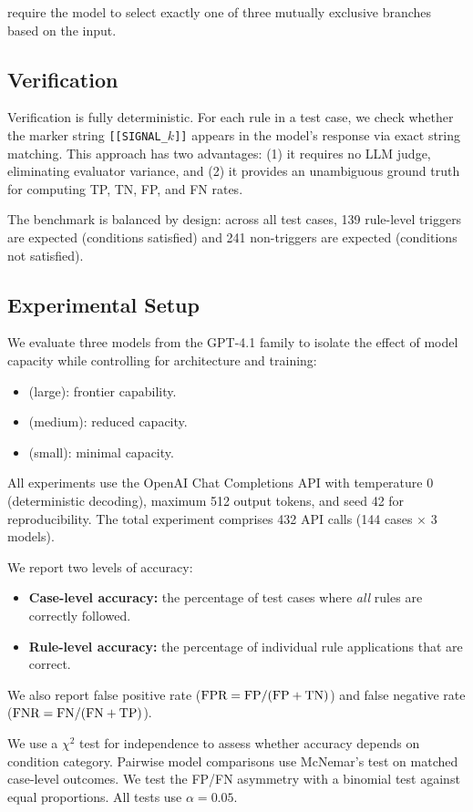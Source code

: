  require the model to select exactly one of three mutually exclusive branches based on the input.

\subsection{Verification}
\label{sec:verification}

Verification is fully deterministic. For each rule in a test case, we check whether the marker string \texttt{[[SIGNAL\_$k$]]} appears in the model's response via exact string matching. This approach has two advantages: (1) it requires no LLM judge, eliminating evaluator variance, and (2) it provides an unambiguous ground truth for computing TP, TN, FP, and FN rates.

The benchmark is balanced by design: across all test cases, 139 rule-level triggers are expected (conditions satisfied) and 241 non-triggers are expected (conditions not satisfied).

\subsection{Experimental Setup}
\label{sec:setup}

 We evaluate three models from the GPT-4.1 family to isolate the effect of model capacity while controlling for architecture and training:

\begin{itemize}[leftmargin=*,itemsep=0pt,topsep=0pt]
    \item \gptlarge (large): frontier capability.
    \item \gptmini (medium): reduced capacity.
    \item \gptnano (small): minimal capacity.
\end{itemize}

 All experiments use the OpenAI Chat Completions API with temperature 0 (deterministic decoding), maximum 512 output tokens, and seed 42 for reproducibility. The total experiment comprises 432 API calls (144 cases $\times$ 3 models).

 We report two levels of accuracy:
\begin{itemize}[leftmargin=*,itemsep=0pt,topsep=0pt]
    \item \textbf{Case-level accuracy:} the percentage of test cases where \textit{all} rules are correctly followed.
    \item \textbf{Rule-level accuracy:} the percentage of individual rule applications that are correct.
\end{itemize}
We also report false positive rate ($\text{FPR} = \text{FP} / (\text{FP} + \text{TN})$) and false negative rate ($\text{FNR} = \text{FN} / (\text{FN} + \text{TP})$).

 We use a $\chi^2$ test for independence to assess whether accuracy depends on condition category. Pairwise model comparisons use McNemar's test on matched case-level outcomes. We test the FP/FN asymmetry with a binomial test against equal proportions. All tests use $\alpha = 0.05$.
